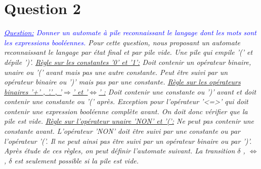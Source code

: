 \documentclass{article}
\begin{document}
\section{Question 2}
\textit{
\textcolor{blue}{
\underline{Question:} 
Donner un automate à pile reconnaissant le langage dont les mots sont les expressions
booléennes.
}
\newline\newline
Pour cette question, nous proposant un automate reconnaissant le langage par état final et par pile vide. 
Une pile qui empile '(' et dépile ')'.
\newline\newline
\underline{Règle sur les constantes '0' et '1':}
Doit contenir un opérateur binaire, unaire ou '(' avant mais pas une autre constante. Peut être suivi par un opérateur binaire ou ')' mais pas par une constante. 
\newline\newline
\underline{Règle sur les opérateurs binaires '+' , '.' , '$\Rightarrow$' et '$\Leftrightarrow$' :}
Doit contenir une constante ou ')' avant et doit contenir une constante ou '(' après. Exception pour l'opérateur '<=>' qui doit contenir une expression booléenne complète avant. On doit donc vérifier que la pile est vide. 
\newline\newline
\underline{Règle sur l'opérateur unaire 'NON' et '(':}
Ne peut pas contenir une constante avant. L'opérateur 'NON' doit être suivi par une constante ou par l'opérateur '('. Il ne peut ainsi pas être suivi par un opérateur binaire ou par ')'. 
\newline\newline
Après étude de ces règles, on peut définir l'automate suivant. La transition $\delta$ , $\Leftrightarrow$ , $\delta$ est seulement possible si la pile est vide.
}
\newline
\end{document}

